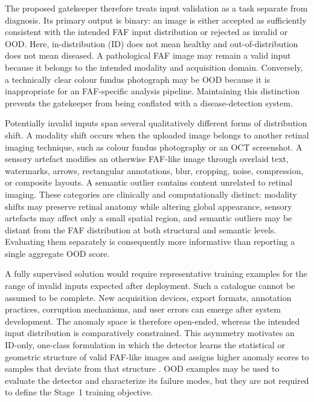 \documentclass[fleqn,12pt]{olplainarticle}
\begin{document}
The proposed gatekeeper therefore treats input validation as a task separate from diagnosis. Its primary output is binary: an image is either accepted as sufficiently consistent with the intended FAF input distribution or rejected as invalid or OOD. Here, in-distribution (ID) does not mean healthy and out-of-distribution does not mean diseased. A pathological FAF image may remain a valid input because it belongs to the intended modality and acquisition domain. Conversely, a technically clear colour fundus photograph may be OOD because it is inappropriate for an FAF-specific analysis pipeline. Maintaining this distinction prevents the gatekeeper from being conflated with a disease-detection system.

Potentially invalid inputs span several qualitatively different forms of distribution shift. A modality shift occurs when the uploaded image belongs to another retinal imaging technique, such as colour fundus photography or an OCT screenshot. A sensory artefact modifies an otherwise FAF-like image through overlaid text, watermarks, arrows, rectangular annotations, blur, cropping, noise, compression, or composite layouts. A semantic outlier contains content unrelated to retinal imaging. These categories are clinically and computationally distinct: modality shifts may preserve retinal anatomy while altering global appearance, sensory artefacts may affect only a small spatial region, and semantic outliers may be distant from the FAF distribution at both structural and semantic levels. Evaluating them separately is consequently more informative than reporting a single aggregate OOD score.

A fully supervised solution would require representative training examples for the range of invalid inputs expected after deployment. Such a catalogue cannot be assumed to be complete. New acquisition devices, export formats, annotation practices, corruption mechanisms, and user errors can emerge after system development. The anomaly space is therefore open-ended, whereas the intended input distribution is comparatively constrained. This asymmetry motivates an ID-only, one-class formulation in which the detector learns the statistical or geometric structure of valid FAF-like images and assigns higher anomaly scores to samples that deviate from that structure \cite{ruff2021unifying,yang2024generalized}. OOD examples may be used to evaluate the detector and characterize its failure modes, but they are not required to define the Stage~1 training objective.
\end{document}
